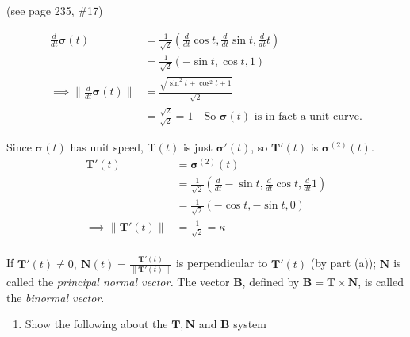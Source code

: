 \documentclass{article}
\newcommand{\norm}[1]{\| #1 \|}
\newcommand{\deriv}[1]{\frac{d}{d #1}}
\begin{document}
\begin{enumerate}
\begin{enumerate}[resume]
\begin{enumerate}[label=(\roman*)]
                        (see page 235, \#17)

                        \begin{align*}
                            \frac{d}{dt} \boldsymbol{\sigma}(t) &= \frac{1}{\sqrt{2}}(\deriv{t} \cos t, \deriv{t} \sin t, \deriv{t} t) \\
                            &= \frac{1}{\sqrt{2}}(- \sin t, \cos t, 1) \\
                            \implies \norm{\deriv{t} \boldsymbol{\sigma}(t)} &= \frac{\sqrt{\sin^2t+\cos^2t+1}}{\sqrt{2}} \\
                            &= \frac{\sqrt{2}}{\sqrt{2}} = 1 \quad \text{So $\boldsymbol{\sigma}(t)$ is in fact a unit curve.}
                        \end{align*}

                        Since $\boldsymbol{\sigma}(t)$ has unit speed, $\boldsymbol{T}(t)$ is just $\boldsymbol{\sigma}'(t)$, so $\boldsymbol{T}'(t)$ is $\boldsymbol{\sigma}^{(2)}(t)$.
                        \begin{align*}
                            \boldsymbol{T}'(t) &= \boldsymbol{\sigma}^{(2)}(t) \\
                            &= \frac{1}{\sqrt{2}}(\deriv{t} - \sin t,\deriv{t}  \cos t, \deriv{t} 1) \\
                            &= \frac{1}{\sqrt{2}}(- \cos t, - \sin t, 0) \\
                            \implies \norm{\boldsymbol{T}'(t)} &= \frac{1}{\sqrt{2}} = \kappa \\
                        \end{align*}
                \end{enumerate}
        \end{enumerate}
        If $\displaystyle \boldsymbol{T}'(t) \not = 0, \: \boldsymbol{N}(t) = \frac{\boldsymbol{T}'(t)}{\norm{\boldsymbol{T}'(t)}}$ is perpendicular to $\boldsymbol{T}'(t)$ (by part (a)); $\boldsymbol{N}$ is called the \textit{principal normal vector.} The vector $\boldsymbol{B}$, defined by $\boldsymbol{B} = \boldsymbol{T} \times \boldsymbol{N}$, is called the \textit{binormal vector}.
        \begin{enumerate}[resume] 
            \item Show the following about the $\boldsymbol{T}, \boldsymbol{N}$ and $\boldsymbol{B}$ system



\end{enumerate}
\end{enumerate}
\end{document}
